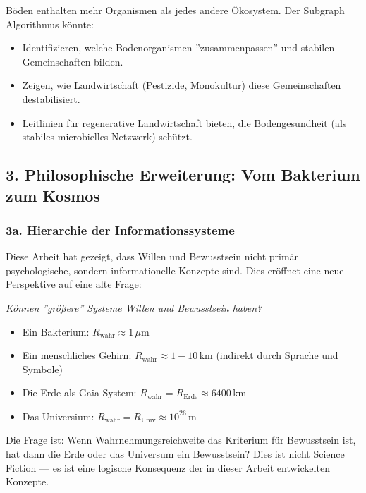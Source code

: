 \documentclass[a4paper,12pt]{article}
\theoremstyle{definition}
\begin{document}
Böden enthalten mehr Organismen als jedes andere Ökosystem. Der Subgraph Algorithmus könnte:
\begin{itemize}
    \item Identifizieren, welche Bodenorganismen ''zusammenpassen'' und stabilen Gemeinschaften bilden.
    
    \item Zeigen, wie Landwirtschaft (Pestizide, Monokultur) diese Gemeinschaften destabilisiert.
    
    \item Leitlinien für regenerative Landwirtschaft bieten, die Bodengesundheit (als stabiles microbielles Netzwerk) schützt.
\end{itemize}

\subsection{3. Philosophische Erweiterung: Vom Bakterium zum Kosmos}

\subsubsection{3a. Hierarchie der Informationssysteme}

Diese Arbeit hat gezeigt, dass Willen und Bewusstsein nicht primär psychologische, sondern informationelle Konzepte sind. Dies eröffnet eine neue Perspektive auf eine alte Frage:

\textit{Können ''größere'' Systeme Willen und Bewusstsein haben?}

\begin{itemize}
    \item Ein Bakterium: $R_{\text{wahr}} \approx 1 \, \mu\text{m}$
    \item Ein menschliches Gehirn: $R_{\text{wahr}} \approx 1-10 \, \text{km}$ (indirekt durch Sprache und Symbole)
    \item Die Erde als Gaia-System: $R_{\text{wahr}} = R_{\text{Erde}} \approx 6400 \, \text{km}$
    \item Das Universium: $R_{\text{wahr}} = R_{\text{Univ}} \approx 10^{26} \, \text{m}$
\end{itemize}

Die Frage ist: Wenn Wahrnehmungsreichweite das Kriterium für Bewusstsein ist, hat dann die Erde oder das Universum ein Bewusstsein? Dies ist nicht Science Fiction --- es ist eine logische Konsequenz der in dieser Arbeit entwickelten Konzepte.
\end{document}
